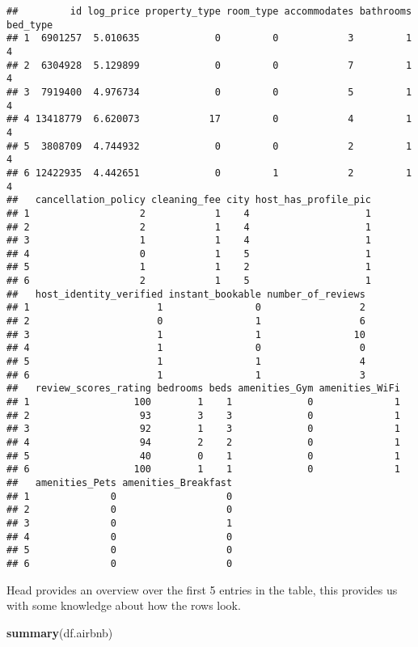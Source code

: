\documentclass[
]{article}
\newenvironment{Shaded}{\begin{snugshade}}{\end{snugshade}}
\newcommand{\KeywordTok}[1]{\textcolor[rgb]{0.13,0.29,0.53}{\textbf{#1}}}
\newcommand{\NormalTok}[1]{#1}
\begin{document}
\begin{verbatim}
##         id log_price property_type room_type accommodates bathrooms bed_type
## 1  6901257  5.010635             0         0            3         1        4
## 2  6304928  5.129899             0         0            7         1        4
## 3  7919400  4.976734             0         0            5         1        4
## 4 13418779  6.620073            17         0            4         1        4
## 5  3808709  4.744932             0         0            2         1        4
## 6 12422935  4.442651             0         1            2         1        4
##   cancellation_policy cleaning_fee city host_has_profile_pic
## 1                   2            1    4                    1
## 2                   2            1    4                    1
## 3                   1            1    4                    1
## 4                   0            1    5                    1
## 5                   1            1    2                    1
## 6                   2            1    5                    1
##   host_identity_verified instant_bookable number_of_reviews
## 1                      1                0                 2
## 2                      0                1                 6
## 3                      1                1                10
## 4                      1                0                 0
## 5                      1                1                 4
## 6                      1                1                 3
##   review_scores_rating bedrooms beds amenities_Gym amenities_WiFi
## 1                  100        1    1             0              1
## 2                   93        3    3             0              1
## 3                   92        1    3             0              1
## 4                   94        2    2             0              1
## 5                   40        0    1             0              1
## 6                  100        1    1             0              1
##   amenities_Pets amenities_Breakfast
## 1              0                   0
## 2              0                   0
## 3              0                   1
## 4              0                   0
## 5              0                   0
## 6              0                   0
\end{verbatim}

Head provides an overview over the first 5 entries in the table, this
provides us with some knowledge about how the rows look.

\begin{Shaded}
\begin{Highlighting}[]
\KeywordTok{summary}\NormalTok{(df.airbnb)}
\end{Highlighting}
\end{Shaded}
\end{document}

